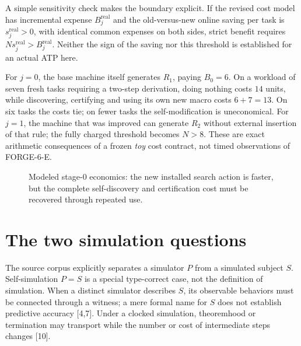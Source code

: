\documentclass[11pt,letterpaper]{article}
\theoremstyle{definition}
\theoremstyle{remark}
\newcommand{\src}[1]{\textup{[#1]}}
\begin{document}
A simple sensitivity check makes the boundary explicit. If the revised cost model has incremental expense $B_j^{\mathrm{real}}$ and the old-versus-new online saving per task is $s_j^{\mathrm{real}}>0$, with identical common expenses on both sides, strict benefit requires $N s_j^{\mathrm{real}}>B_j^{\mathrm{real}}$. Neither the sign of the saving nor this threshold is established for an actual ATP here.

For $j=0$, the base machine itself generates $R_1$, paying $B_0=6$. On a workload of seven fresh tasks requiring a two-step derivation, doing nothing costs $14$ units, while discovering, certifying and using its own new macro costs $6+7=13$. On six tasks the costs tie; on fewer tasks the self-modification is uneconomical. For $j=1$, the machine that was improved can generate $R_2$ without external insertion of that rule; the fully charged threshold becomes $N>8$. These are exact arithmetic consequences of a frozen \emph{toy} cost contract, not timed observations of FORGE-6-E.

\begin{figure}[htbp]\centering
{}
\caption{Modeled stage-$0$ economics: the new installed search action is faster, but the complete self-discovery and certification cost must be recovered through repeated use.}
\end{figure}

\section{The two simulation questions}
The source corpus explicitly separates a simulator $P$ from a simulated subject $S$. Self-simulation $P=S$ is a special type-correct case, not the definition of simulation. When a distinct simulator describes $S$, its observable behaviors must be connected through a witness; a mere formal name for $S$ does not establish predictive accuracy \src{4,7}. Under a clocked simulation, theoremhood or termination may transport while the number or cost of intermediate steps changes \src{10}.
\end{document}
